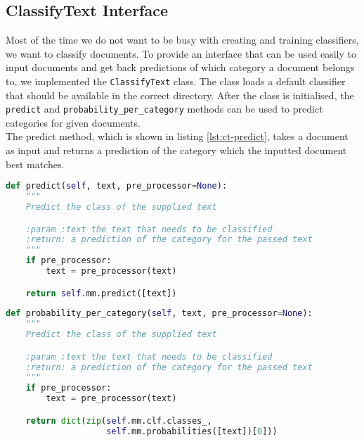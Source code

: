 \subsection{ClassifyText Interface}
Most of the time we do not want to be busy with creating and training classifiers, we want to classify documents. To provide an interface that can be used easily to input documents and get back predictions of which category a document belongs to, we implemented the \texttt{ClassifyText} class. The class loads a default classifier that should be available in the correct directory. After the class is initialised, the \texttt{predict} and \texttt{probability\_per\_category} methods can be used to predict categories for given documents.\\

The predict method, which is shown in listing \ref{lst:ct-predict}, takes a document as input and returns a prediction of the category which the inputted document best matches.\\

\begin{lstlisting}[language=python, caption={Predict method of the ClassifyText class}, label={lst:ct-predict}]
def predict(self, text, pre_processor=None):
    """
    Predict the class of the supplied text

    :param :text the text that needs to be classified
    :return: a prediction of the category for the passed text
    """
    if pre_processor:
        text = pre_processor(text)

    return self.mm.predict([text])
\end{lstlisting}



\begin{lstlisting}[language=python, caption={probability\_per\_category method of the ClassifyText class}, label={lst:ct-prob}]
def probability_per_category(self, text, pre_processor=None):
    """
    Predict the class of the supplied text

    :param :text the text that needs to be classified
    :return: a prediction of the category for the passed text
    """
    if pre_processor:
        text = pre_processor(text)

    return dict(zip(self.mm.clf.classes_,
                    self.mm.probabilities([text])[0]))
\end{lstlisting}

